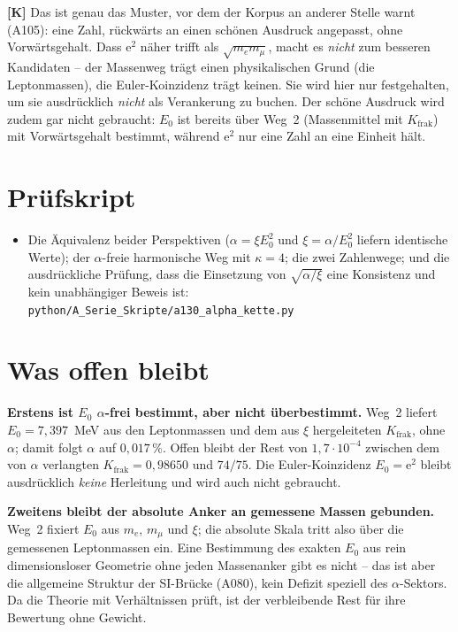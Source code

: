 \textbf{[K]} Das ist genau das Muster, vor dem der Korpus an anderer Stelle warnt
(A105): eine Zahl, rückwärts an einen schönen Ausdruck angepasst, ohne
Vorwärtsgehalt. Dass $\mathrm{e}^2$ näher trifft als $\sqrt{m_e m_\mu}$, macht es
\emph{nicht} zum besseren Kandidaten -- der Massenweg trägt einen physikalischen
Grund (die Leptonmassen), die Euler-Koinzidenz trägt keinen. Sie wird hier nur
festgehalten, um sie ausdrücklich \emph{nicht} als Verankerung zu buchen. Der
schöne Ausdruck wird zudem gar nicht gebraucht: $E_0$ ist bereits über
Weg~2 (Massenmittel mit $K_\text{frak}$) mit Vorwärtsgehalt bestimmt, während
$\mathrm{e}^2$ nur eine Zahl an eine Einheit hält.

\section{Prüfskript}

\begin{itemize}
  \item Die Äquivalenz beider Perspektiven ($\alpha = \xi E_0^2$ und
    $\xi = \alpha/E_0^2$ liefern identische Werte); der $\alpha$-freie
    harmonische Weg mit $\kappa = 4$; die zwei Zahlenwege; und die ausdrückliche
    Prüfung, dass die Einsetzung von $\sqrt{\alpha/\xi}$ eine Konsistenz und kein
    unabhängiger Beweis ist:
    \texttt{python/A\_Serie\_Skripte/a130\_alpha\_kette.py}
\end{itemize}

\section{Was offen bleibt}

\textbf{Erstens ist $E_0$ $\alpha$-frei bestimmt, aber nicht überbestimmt.}
Weg~2 liefert $E_0 = 7{,}397$~MeV aus den Leptonmassen und dem aus $\xi$
hergeleiteten $K_\text{frak}$, ohne $\alpha$; damit folgt $\alpha$ auf
$0{,}017\,\%$. Offen bleibt der Rest von $1{,}7\cdot10^{-4}$ zwischen dem von
$\alpha$ verlangten $K_\text{frak} = 0{,}98650$ und $74/75$. Die
Euler-Koinzidenz $E_0 = \mathrm{e}^2$ bleibt ausdrücklich \emph{keine} Herleitung
und wird auch nicht gebraucht.

\textbf{Zweitens bleibt der absolute Anker an gemessene Massen gebunden.}
Weg~2 fixiert $E_0$ aus $m_e$, $m_\mu$ und $\xi$; die absolute Skala tritt also
über die gemessenen Leptonmassen ein. Eine Bestimmung des exakten $E_0$ aus
rein dimensionsloser Geometrie ohne jeden Massenanker gibt es nicht -- das ist
aber die allgemeine Struktur der SI-Brücke (A080), kein Defizit speziell des
$\alpha$-Sektors. Da die Theorie mit Verhältnissen prüft, ist der verbleibende
Rest für ihre Bewertung ohne Gewicht.

